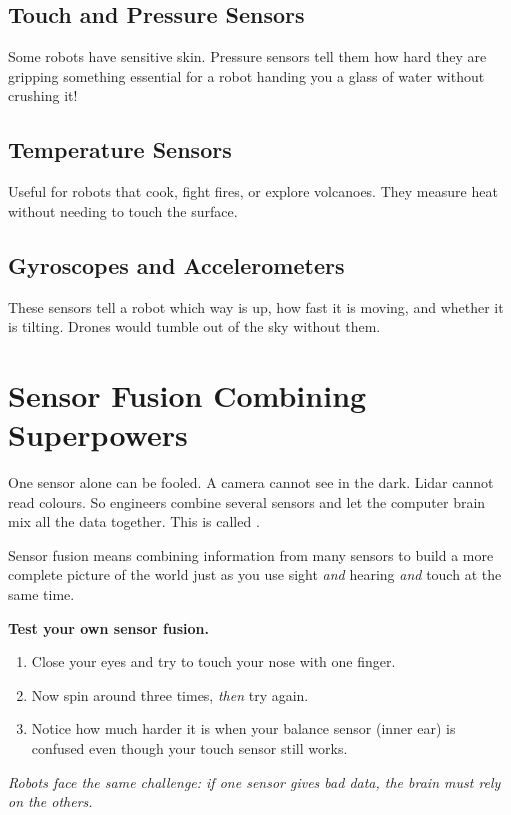 \subsection*{Touch and Pressure Sensors}

Some robots have sensitive skin. Pressure sensors tell them how hard
they are gripping something \textemdash{} essential for a robot handing you
a glass of water without crushing it!

\subsection*{Temperature Sensors}

Useful for robots that cook, fight fires, or explore volcanoes.
They measure heat without needing to touch the surface.

\subsection*{Gyroscopes and Accelerometers}

These sensors tell a robot which way is up, how fast it is moving,
and whether it is tilting. Drones would tumble out of the sky without them.


\sectionrule

\section*{Sensor Fusion \textemdash{} Combining Superpowers}

One sensor alone can be fooled. A camera cannot see in the dark. Lidar
cannot read colours. So engineers combine several sensors and let the
computer brain mix all the data together. This is called .

\begin{bigidea}
  Sensor fusion means combining information from many sensors
  to build a more complete picture of the world \textemdash{}
  just as you use sight \emph{and} hearing \emph{and} touch at the same time.
\end{bigidea}

\sectionrule

\begin{experiment}
  \textbf{Test your own sensor fusion.}
  \begin{enumerate}
    \item Close your eyes and try to touch your nose with one finger.
    \item Now spin around three times, \emph{then} try again.
    \item Notice how much harder it is when your balance sensor (inner ear)
      is confused \textemdash{} even though your touch sensor still works.
  \end{enumerate}
  \textit{Robots face the same challenge: if one sensor gives bad data,
  the brain must rely on the others.}
\end{experiment}

